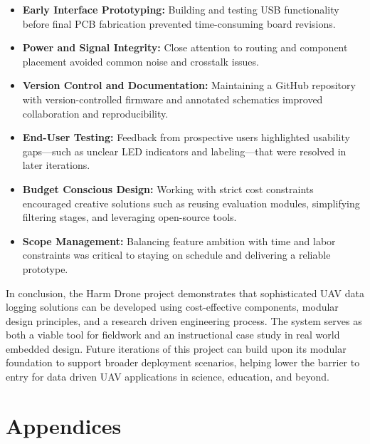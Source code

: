 \documentclass[12pt]{article}
\begin{document}
\begin{itemize}
\item \textbf{Early Interface Prototyping:} Building and testing USB functionality before final PCB fabrication prevented time-consuming board revisions.
\item \textbf{Power and Signal Integrity:} Close attention to routing and component placement avoided common noise and crosstalk issues.
\item \textbf{Version Control and Documentation:} Maintaining a GitHub repository with version-controlled firmware and annotated schematics improved collaboration and reproducibility.
\item \textbf{End-User Testing:} Feedback from prospective users highlighted usability gaps—such as unclear LED indicators and labeling—that were resolved in later iterations.
\item \textbf{Budget Conscious Design:} Working with strict cost constraints encouraged creative solutions such as reusing evaluation modules, simplifying filtering stages, and leveraging open-source tools.
\item \textbf{Scope Management:} Balancing feature ambition with time and labor constraints was critical to staying on schedule and delivering a reliable prototype.
\end{itemize}

\par In conclusion, the Harm Drone project demonstrates that sophisticated UAV data logging solutions can be developed using cost-effective components, modular design principles, and a research driven engineering process. The system serves as both a viable tool for fieldwork and an instructional case study in real world embedded design. Future iterations of this project can build upon its modular foundation to support broader deployment scenarios, helping lower the barrier to entry for data driven UAV applications in science, education, and beyond.


\section{Appendices}
\end{document}
